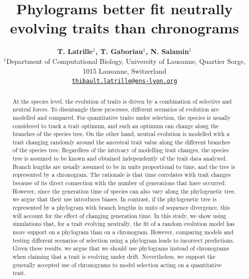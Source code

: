 \documentclass{article}
\title{Phylograms better fit neutrally evolving traits than chronograms}
\author{
\large
\textbf{T. {Latrille}$^{1}$\orcidlink{0000-0002-9643-4668}, T. {Gaboriau}$^{1}$\orcidlink{0000-0001-7530-2204}, N. {Salamin}$^{1}$\orcidlink{0000-0002-3963-4954}}\\
\normalsize
$^{1}$Department of Computational Biology, University of Lausanne, Quartier Sorge, 1015 Lausanne, Switzerland\\
\texttt{\href{mailto:thibault.latrille@ens-lyon.org}{thibault.latrille@ens-lyon.org}} \\
}
\begin{document}
\maketitle

\begin{abstract}
At the species level, the evolution of traits is driven by a combination of selective and neutral forces. To disentangle these processes, different scenarios of evolution are modelled and compared. For quantitative traits under selection, the species is usually considered to track a trait optimum, and such an optimum can change along the branches of the species tree. On the other hand, neutral evolution is modelled with a trait changing randomly around the ancestral trait value along the different branches of the species tree. Regardless of the intricacy of modelling trait changes, the species tree is assumed to be known and obtained independently of the trait data analysed. Branch lengths are usually assumed to be in units proportional to time, and the tree is represented by a chronogram. The rationale is that time correlates with trait changes because of its direct connection with the number of generations that have occurred. However, since the generation time of species can also vary along the phylogenetic tree, we argue that their use introduces biases. In contrast, if the phylogenetic tree is represented by a phylogram with branch lengths in units of sequence divergence, this will account for the effect of changing generation time. In this study, we show using simulations that, for a trait evolving neutrally, the fit of a random evolution model has more support on a phylogram than on a chronogram. However, comparing models and testing different scenarios of selection using a phylogram leads to incorrect predictions. Given these results, we argue that we should use phylograms instead of chronograms when claiming that a trait is evolving under drift. Nevertheless, we support the generally accepted use of chronograms to model selection acting on a quantitative trait.
\end{abstract}


\newpage
\end{document}
